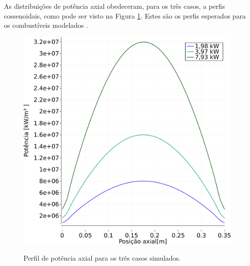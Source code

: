 As distribuições de potência axial obedeceram, para os três casos, a perfis
cossenoidais, como pode ser visto na Figura \ref{fig:perf-nac-axial}. Estes são os perfis esperados para
os combustíveis modelados \cite{Veloso2005}.%

\begin{figure}[htb]
  \caption{Perfil de potência axial para os três casos simulados.}
  \centering\includegraphics[scale=0.5]{figuras/Q_all_NC_port.png}
  \label{fig:perf-nac-axial}
\end{figure}


